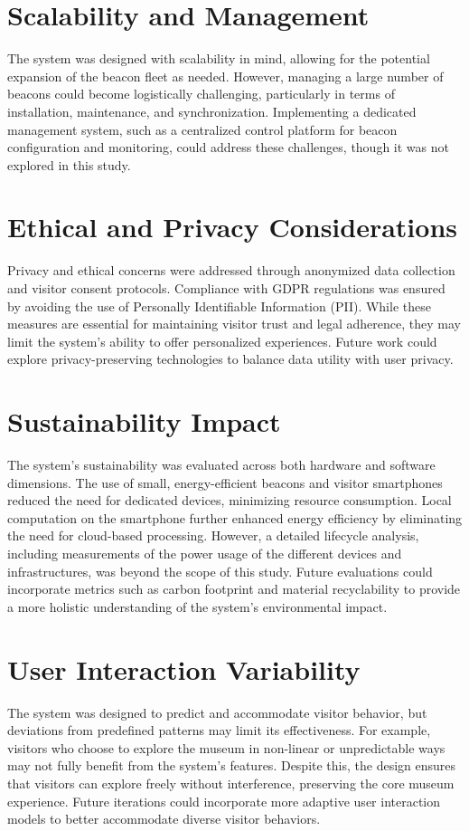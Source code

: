 \section{Scalability and Management}
The system was designed with scalability in mind, allowing for the potential expansion of the beacon fleet as needed. However, managing a large number of beacons could become logistically challenging, particularly in terms of installation, maintenance, and synchronization. Implementing a dedicated management system, such as a centralized control platform for beacon configuration and monitoring, could address these challenges, though it was not explored in this study.

\section{Ethical and Privacy Considerations}
Privacy and ethical concerns were addressed through anonymized data collection and visitor consent protocols. Compliance with GDPR regulations was ensured by avoiding the use of Personally Identifiable Information (PII). While these measures are essential for maintaining visitor trust and legal adherence, they may limit the system’s ability to offer personalized experiences. Future work could explore privacy-preserving technologies to balance data utility with user privacy.

\section{Sustainability Impact}
The system’s sustainability was evaluated across both hardware and software dimensions. The use of small, energy-efficient beacons and visitor smartphones reduced the need for dedicated devices, minimizing resource consumption. Local computation on the smartphone further enhanced energy efficiency by eliminating the need for cloud-based processing. However, a detailed lifecycle analysis, including measurements of the power usage of the different devices and infrastructures, was beyond the scope of this study. Future evaluations could incorporate metrics such as carbon footprint and material recyclability to provide a more holistic understanding of the system’s environmental impact.

\section{User Interaction Variability}
The system was designed to predict and accommodate visitor behavior, but deviations from predefined patterns may limit its effectiveness. For example, visitors who choose to explore the museum in non-linear or unpredictable ways may not fully benefit from the system’s features. Despite this, the design ensures that visitors can explore freely without interference, preserving the core museum experience. Future iterations could incorporate more adaptive user interaction models to better accommodate diverse visitor behaviors. 

